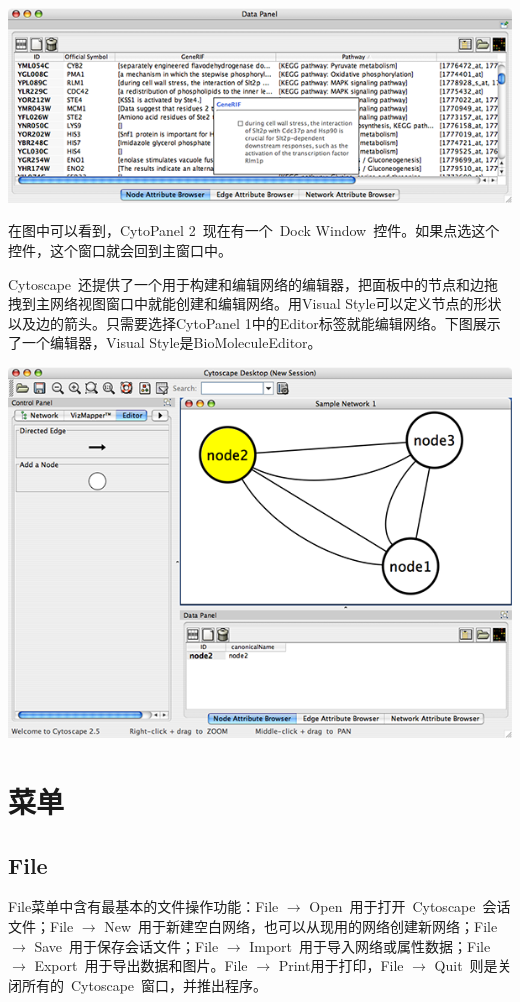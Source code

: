 {\centering
\includegraphics[width=\textwidth]{images/attribute_browser_26.png}
}

在图中可以看到，CytoPanel 2~现在有一个~Dock Window~控件。如果点选这个控件，这个窗口就会回到主窗口中。

Cytoscape~还提供了一个用于构建和编辑网络的编辑器，把面板中的节点和边拖拽到主网络视图窗口中就能创建和编辑网络。用Visual Style可以定义节点的形状以及边的箭头。只需要选择CytoPanel 1中的Editor标签就能编辑网络。下图展示了一个编辑器，Visual Style是BioMoleculeEditor。

{\centering
\includegraphics[width=\textwidth]{images/editor_25.png}}

\section{菜单}
	\subsection{File}
	File菜单中含有最基本的文件操作功能：File $\rightarrow$ Open~用于打开~Cytoscape~会话文件；File $\rightarrow$ New~用于新建空白网络，也可以从现用的网络创建新网络；File $\rightarrow$ Save~用于保存会话文件；File $\rightarrow$ Import~用于导入网络或属性数据；File $\rightarrow$ Export~用于导出数据和图片。File $\rightarrow$ Print用于打印，File $\rightarrow$ Quit~则是关闭所有的~Cytoscape~窗口，并推出程序。

